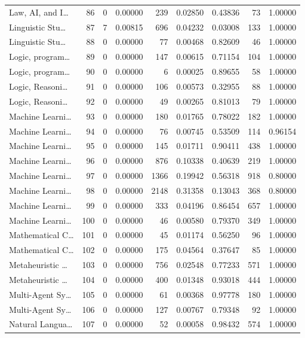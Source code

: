\begin{table}
\begin{tabular}{lrrrrrrrr}
Law, AI, and I… & 86 & 0 & 0.00000 & 239 & 0.02850 & 0.43836 & 73 & 1.00000 \\
Linguistic Stu… & 87 & 7 & 0.00815 & 696 & 0.04232 & 0.03008 & 133 & 1.00000 \\
Linguistic Stu… & 88 & 0 & 0.00000 & 77 & 0.00468 & 0.82609 & 46 & 1.00000 \\
Logic, program… & 89 & 0 & 0.00000 & 147 & 0.00615 & 0.71154 & 104 & 1.00000 \\
Logic, program… & 90 & 0 & 0.00000 & 6 & 0.00025 & 0.89655 & 58 & 1.00000 \\
Logic, Reasoni… & 91 & 0 & 0.00000 & 106 & 0.00573 & 0.32955 & 88 & 1.00000 \\
Logic, Reasoni… & 92 & 0 & 0.00000 & 49 & 0.00265 & 0.81013 & 79 & 1.00000 \\
Machine Learni… & 93 & 0 & 0.00000 & 180 & 0.01765 & 0.78022 & 182 & 1.00000 \\
Machine Learni… & 94 & 0 & 0.00000 & 76 & 0.00745 & 0.53509 & 114 & 0.96154 \\
Machine Learni… & 95 & 0 & 0.00000 & 145 & 0.01711 & 0.90411 & 438 & 1.00000 \\
Machine Learni… & 96 & 0 & 0.00000 & 876 & 0.10338 & 0.40639 & 219 & 1.00000 \\
Machine Learni… & 97 & 0 & 0.00000 & 1366 & 0.19942 & 0.56318 & 918 & 0.80000 \\
Machine Learni… & 98 & 0 & 0.00000 & 2148 & 0.31358 & 0.13043 & 368 & 0.80000 \\
Machine Learni… & 99 & 0 & 0.00000 & 333 & 0.04196 & 0.86454 & 657 & 1.00000 \\
Machine Learni… & 100 & 0 & 0.00000 & 46 & 0.00580 & 0.79370 & 349 & 1.00000 \\
Mathematical C… & 101 & 0 & 0.00000 & 45 & 0.01174 & 0.56250 & 96 & 1.00000 \\
Mathematical C… & 102 & 0 & 0.00000 & 175 & 0.04564 & 0.37647 & 85 & 1.00000 \\
Metaheuristic … & 103 & 0 & 0.00000 & 756 & 0.02548 & 0.77233 & 571 & 1.00000 \\
Metaheuristic … & 104 & 0 & 0.00000 & 400 & 0.01348 & 0.93018 & 444 & 1.00000 \\
Multi-Agent Sy… & 105 & 0 & 0.00000 & 61 & 0.00368 & 0.97778 & 180 & 1.00000 \\
Multi-Agent Sy… & 106 & 0 & 0.00000 & 127 & 0.00767 & 0.79348 & 92 & 1.00000 \\
Natural Langua… & 107 & 0 & 0.00000 & 52 & 0.00058 & 0.98432 & 574 & 1.00000 \\

\end{tabular}
\end{table}
